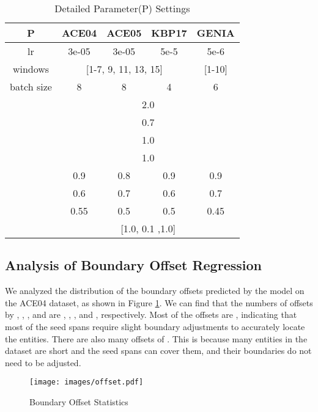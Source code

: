 \documentclass[11pt,a4paper]{article}
\begin{document}
\begin{table}[!t]
\small
\centering
\begingroup
\renewcommand{\arraystretch}{1.4} \begin{tabular}{c|c|c|c|c}
\toprule
\textbf{P}  & \textbf{ACE04}& \textbf{ACE05}& \textbf{KBP17}& \textbf{GENIA} \\
\midrule
lr & 3e-05 & 3e-05 & 5e-5 & 5e-6 \\
\hline
windows &  \multicolumn{3}{c|}{[1-7, 9, 11, 13, 15]} & [1-10] \\
\hline
batch size & 8 & 8 & 4 & 6 \\
\hline
& \multicolumn{4}{c}{2.0} \\
\hline
& \multicolumn{4}{c}{0.7} \\
\hline
& \multicolumn{4}{c}{1.0} \\
\hline
& \multicolumn{4}{c}{1.0} \\
\hline
& 0.9 & 0.8 & 0.9 &0.9  \\
\hline
& 0.6 & 0.7 & 0.6 & 0.7  \\
\hline
& 0.55 & 0.5 & 0.5 & 0.45\\
\hline
 & \multicolumn{4}{c}{[1.0, 0.1 ,1.0]}\\
\bottomrule
\end{tabular}
\endgroup
\caption{Detailed Parameter(P) Settings}
\label{tab:hp}
\end{table}



\subsection{Analysis of Boundary Offset Regression}

We analyzed the distribution of the boundary offsets predicted by the model on the ACE04 dataset, as shown in Figure \ref{fig:offset}. We can find that the numbers of offsets by , , ,  and   are , , ,  and , respectively. Most of the offsets are , indicating that most of the seed spans require slight boundary adjustments to accurately locate the entities. There are also many offsets of . This is because many entities in the dataset are short and the seed spans can cover them, and their boundaries do not need to be adjusted.

\begin{figure}[h]
  \centering
  \texttt{[image: images/offset.pdf]}
  \caption{Boundary Offset Statistics}
  \label{fig:offset}
\end{figure}
\end{document}
